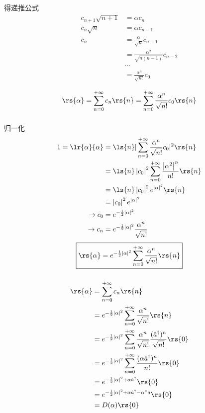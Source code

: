 \begin{frame}
    \frametitle{}
    得递推公式
    \[\begin{aligned}
      c_{n+1} \sqrt{n+1} &=\alpha c_n \\
      c_{n} \sqrt{n} &=\alpha c_{n-1} \\
      c_{n}  &=\frac{\alpha}{\sqrt{n}} c_{n-1} \\
              &=\frac{\alpha^2}{\sqrt{n(n-1)}} c_{n-2} \\
              & \cdots  \\ 
              &=\frac{\alpha^n}{\sqrt{n!}} c_{0} \\
  \end{aligned} \]
  \[ \rs{\alpha} = \sum_{n=0} ^{+\infty} c_n  \rs{n} = \sum_{n=0} ^{+\infty} \frac{\alpha^n}{\sqrt{n!}} c_{0} \rs{n} \]
\end{frame}

\begin{frame}
    \frametitle{}
    归一化
    \[ \begin{aligned}
      1=\lr{\alpha}{\alpha} &=\ls{n}|\sum_{n=0} ^{+\infty} \frac{\alpha^n}{\sqrt{n!}} c_{0}|^2 \rs{n} \\ 
      &= \ls{n}\left|c_0\right|^2 \sum_{n=0} ^{+\infty} \frac{\left|\alpha^2\right|^n}{n!}  \rs{n} \\ 
      &= \ls{n}\left|c_0\right|^2 e^{\left|\alpha\right|^2}  \rs{n} \\  
      &= \left|c_0\right|^2 e^{\left|\alpha\right|^2}  \\ 
      \to c_0 &=   e^{-\frac{1}{2}\left|\alpha\right|^2} \\
      \to c_n &=  e^{-\frac{1}{2}\left|\alpha\right|^2} \frac{\alpha^n}{\sqrt{n!}}  
  \end{aligned}\]
  \[ \boxed{\rs{\alpha} = e^{-\frac{1}{2}\left|\alpha\right|^2}  \sum_{n=0} ^{+\infty}  \frac{\alpha^n}{\sqrt{n!}} \rs{n}}\]
\end{frame}

\begin{frame}
    \frametitle{}
    \[
  \begin{aligned}
          \rs{\alpha} &= \sum_{n=0} ^{+\infty} c_n  \rs{n}  \\
          &=  e^{-\frac{1}{2}\left|\alpha\right|^2}  \sum_{n=0} ^{+\infty}  \frac{\alpha^n}{\sqrt{n!}} \rs{n} \\ 
          &= e^{-\frac{1}{2}\left|\alpha\right|^2}  \sum_{n=0} ^{+\infty}  \frac{\alpha^n}{\sqrt{n!}} \frac{(\hat{a}^\dagger)^n}{\sqrt{n!}}\rs{0} \\ 
          &= e^{-\frac{1}{2}\left|\alpha\right|^2}  \sum_{n=0} ^{+\infty}  \frac{(\alpha\hat{a}^\dagger)^n}{n!}\rs{0} \\ 
          &=  e^{-\frac{1}{2}\left|\alpha\right|^2 + \alpha \hat{a}^\dagger }  \rs{0} \\ 
          &=  e^{-\frac{1}{2}\left|\alpha\right|^2 + \alpha \hat{a}^\dagger -\alpha^{*} a}  \rs{0}  \\ 
          &=  D(\alpha)  \rs{0} 
  \end{aligned}    
    \]
\end{frame}

